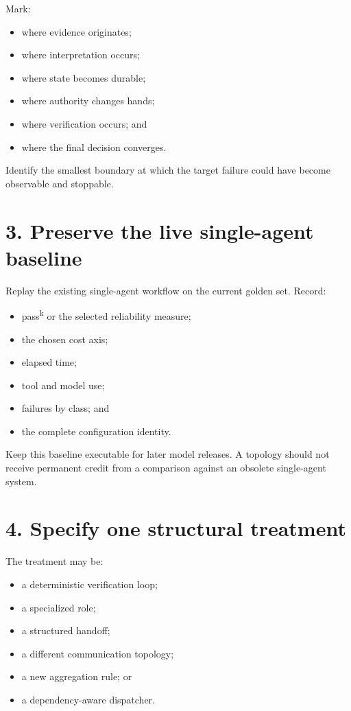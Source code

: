 Mark:

\begin{itemize}
\tightlist
\item
  where evidence originates;
\item
  where interpretation occurs;
\item
  where state becomes durable;
\item
  where authority changes hands;
\item
  where verification occurs; and
\item
  where the final decision converges.
\end{itemize}

Identify the smallest boundary at which the target failure could have become observable and stoppable.

\section{3. Preserve the live single-agent baseline}\label{preserve-the-live-single-agent-baseline}

Replay the existing single-agent workflow on the current golden set. Record:

\begin{itemize}
\tightlist
\item
  pass\textsuperscript{k} or the selected reliability measure;
\item
  the chosen cost axis;
\item
  elapsed time;
\item
  tool and model use;
\item
  failures by class; and
\item
  the complete configuration identity.
\end{itemize}

Keep this baseline executable for later model releases. A topology should not receive permanent credit from a comparison against an obsolete single-agent system.

\section{4. Specify one structural treatment}\label{specify-one-structural-treatment}

The treatment may be:

\begin{itemize}
\tightlist
\item
  a deterministic verification loop;
\item
  a specialized role;
\item
  a structured handoff;
\item
  a different communication topology;
\item
  a new aggregation rule; or
\item
  a dependency-aware dispatcher.
\end{itemize}

